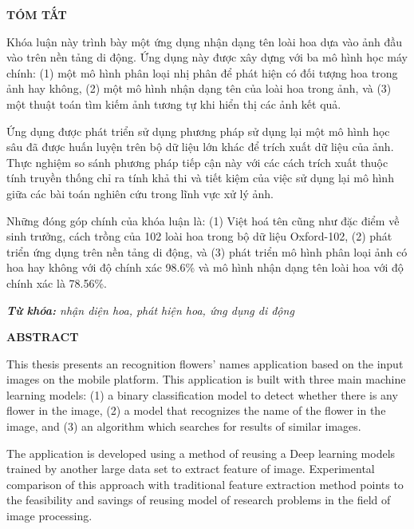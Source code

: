 \documentclass[12pt]{report}
\begin{document}
		\newpage
		\begin{center}
			\textbf{\large TÓM TẮT}
		\end{center}
																																			
		Khóa luận này trình bày một ứng dụng nhận dạng tên loài hoa dựa vào ảnh đầu vào trên nền tảng di động. Ứng dụng này được xây dựng với ba mô hình học máy chính: (1) một mô hình phân loại nhị phân để phát hiện có đối tượng hoa trong ảnh hay không, (2) một mô hình nhận dạng tên của loài hoa trong ảnh, và (3) một thuật toán tìm kiếm ảnh tương tự khi hiển thị các ảnh kết quả. 
																	
		Ứng dụng được phát triển sử dụng phương pháp sử dụng lại một mô hình học sâu đã được huấn luyện trên bộ dữ liệu lớn khác để trích xuất dữ liệu của ảnh. Thực nghiệm so sánh phương pháp tiếp cận này với các cách trích xuất thuộc tính truyền thống chỉ ra tính khả thi và tiết kiệm của việc sử dụng lại mô hình giữa các bài toán nghiên cứu trong lĩnh vực xử lý ảnh.
																	
		Những đóng góp chính của khóa luận là: (1) Việt hoá tên cũng như đặc điểm về sinh trưởng, cách trồng của 102 loài hoa trong bộ dữ liệu Oxford-102, (2) phát triển ứng dụng trên nền tảng di động, và (3) phát triển mô hình phân loại ảnh có hoa hay không với độ chính xác 98.6\% và mô hình nhận dạng tên loài hoa với độ chính xác là 78.56\%.																			
																																																																										
		\noindent \textit{\textbf{Từ khóa:} nhận diện hoa, phát hiện hoa, ứng dụng di động}
																																																																										
		\newpage
		\begin{center}
			\textbf{\large ABSTRACT}
		\end{center}
																																																																										
		This thesis presents an recognition flowers’ names application based on the input images on the mobile platform. This application is built with three main machine learning models: (1) a binary classification model to detect whether there is any flower in the image, (2) a model that recognizes the name of the flower in the image, and (3) an algorithm which searches for results of similar images. 
																																																																										
		The application is developed using a method of reusing a Deep learning models trained by another large data set to extract feature of image. Experimental comparison of this approach with traditional feature extraction method points to the feasibility and savings of reusing model of research problems in the field of image processing.
																																																																										
\end{document}
